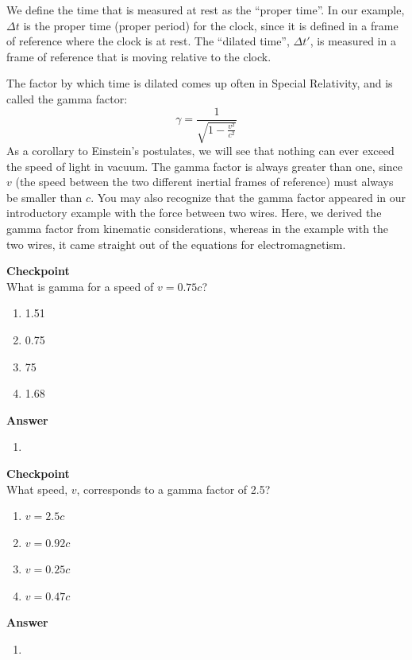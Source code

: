 We define the time that is measured at rest as the ``proper time''. In our example, $\Delta t$ is the proper time (proper period) for the clock, since it is defined in a frame of reference where the clock is at rest. The ``dilated time'', $\Delta t'$, is measured in a frame of reference that is moving relative to the clock.

The factor by which time is dilated comes up often in Special Relativity, and is called the gamma factor:
\begin{equation}
\boxed{\gamma = \frac{1}{\sqrt{1-\frac{v^2}{c^2}}}}
\end{equation}
As a corollary to Einstein's postulates, we will see that nothing can ever exceed the speed of light in vacuum. The gamma factor is always greater than one, since $v$ (the speed between the two different inertial frames of reference) must always be smaller than $c$. You may also recognize that the gamma factor appeared in our introductory example with the force between two wires. Here, we derived the gamma factor from kinematic considerations, whereas in the example with the two wires, it came straight out of the equations for electromagnetism.

\begin{framed}
\textbf{Checkpoint}\\
What is gamma for a speed of $v=0.75c$?

\begin{enumerate}
\item 1.51
\item 0.75
\item 75
\item 1.68
\end{enumerate}

\begin{framed}
\textbf{Answer}\\
\begin{enumerate}
\item
\end{enumerate}
\end{framed}
\end{framed}

\begin{framed}
\textbf{Checkpoint}\\
What speed, $v$, corresponds to a gamma factor of 2.5?

\begin{enumerate}
\item $v=2.5c$
\item $v=0.92c$
\item $v=0.25c$
\item $v=0.47c$
\end{enumerate}

\begin{framed}
\textbf{Answer}\\
\begin{enumerate}[resume]
\item
\end{enumerate}
\end{framed}
\end{framed}

